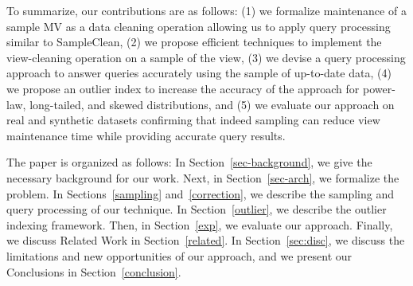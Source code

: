 
To summarize, our contributions are as follows: (1) we formalize maintenance of a sample MV as a data cleaning operation allowing us to apply query processing similar to SampleClean, (2) we propose efficient techniques to implement the view-cleaning operation on a sample of the view, (3) we devise a query processing approach to answer queries accurately using the sample of up-to-date data, (4) we propose an outlier index to increase the accuracy of the approach for power-law, long-tailed, and skewed distributions, and (5) we evaluate our approach on real and synthetic datasets confirming that indeed sampling can reduce view maintenance time while providing accurate query results. 

The paper is organized as follows: 
In Section~\ref{sec-background}, we give the necessary background for our work.
Next, in Section~\ref{sec-arch}, we formalize the problem.
In Sections~\ref{sampling} and~\ref{correction}, we describe the sampling and query processing of our technique.
In Section~\ref{outlier}, we describe the outlier indexing framework.
Then, in Section~\ref{exp}, we evaluate our approach.
Finally, we discuss Related Work in Section~\ref{related}.
In Section~\ref{sec:disc}, we discuss the limitations and new opportunities of our approach, and we present our Conclusions in Section~\ref{conclusion}.
